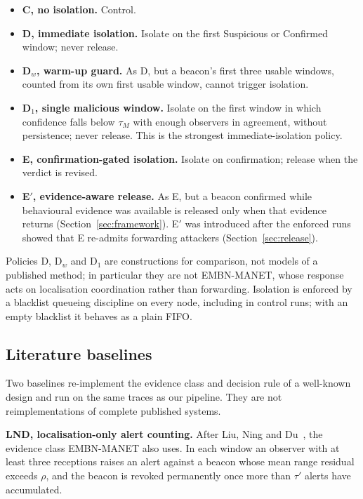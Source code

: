 \begin{itemize}
\item \textbf{C, no isolation.} Control.
\item \textbf{D, immediate isolation.} Isolate on the first Suspicious or
      Confirmed window; never release.
\item \textbf{D$_w$, warm-up guard.} As D, but a beacon's first three usable
      windows, counted from its own first usable window, cannot trigger
      isolation.
\item \textbf{D$_1$, single malicious window.} Isolate on the first window in
      which confidence falls below $\tau_M$ with enough observers in
      agreement, without persistence; never release. This is the strongest
      immediate-isolation policy.
\item \textbf{E, confirmation-gated isolation.} Isolate on confirmation;
      release when the verdict is revised.
\item \textbf{E$'$, evidence-aware release.} As E, but a beacon confirmed while
      behavioural evidence was available is released only when that evidence
      returns (Section~\ref{sec:framework}). E$'$ was introduced after the
      enforced runs showed that E re-admits forwarding attackers
      (Section~\ref{sec:release}).
\end{itemize}

Policies D, D$_w$ and D$_1$ are constructions for comparison, not models of a
published method; in particular they are not EMBN-MANET, whose response acts
on localisation coordination rather than forwarding. Isolation is enforced by
a blacklist queueing discipline on every node, including in control runs;
with an empty blacklist it behaves as a plain FIFO.

\subsection{Literature baselines}
\label{sec:baselinedef}

Two baselines re-implement the evidence class and decision rule of a
well-known design and run on the same traces as our pipeline. They are not
reimplementations of complete published systems.

\textbf{LND, localisation-only alert counting.} After Liu, Ning and
Du~\cite{liu2005detecting}, the evidence class EMBN-MANET also uses. In each
window an observer with at least three receptions raises an alert against a
beacon whose mean range residual exceeds $\rho$, and the beacon is revoked
permanently once more than $\tau'$ alerts have accumulated.

